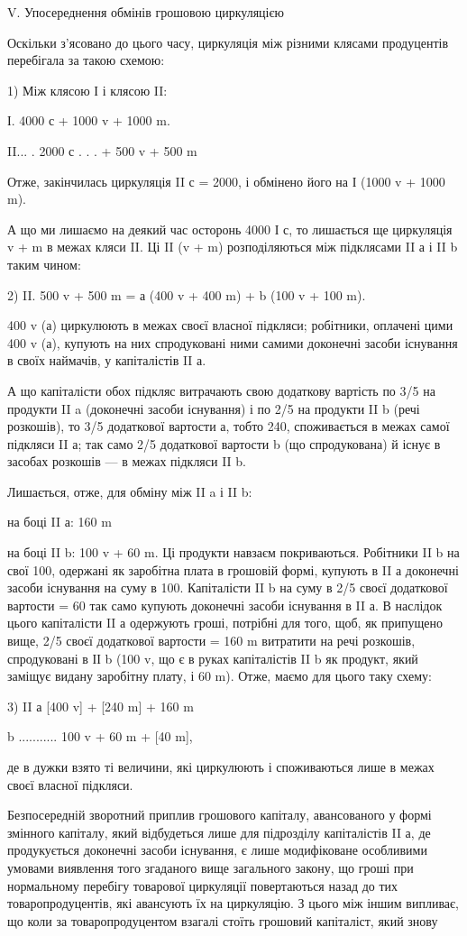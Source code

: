 V. Упосереднення обмінів грошовою циркуляцією

Оскільки з’ясовано до цього часу, циркуляція між різними клясами
продуцентів перебігала за такою схемою:

1) Між клясою І і клясою II:

І. 4000 с + 1000 v + 1000 m.

II... .    2000 с . . . + 500 v + 500 m

Отже, закінчилась циркуляція II с = 2000, і обмінено його на
І (1000 v + 1000 m).

А що ми лишаємо на деякий час осторонь 4000 І с, то лишається ще
циркуляція v + m в межах кляси II. Ці II (v + m) розподіляються між
підклясами II а і II b таким чином:

2) II. 500 v + 500 m = а (400 v + 400 m) + b (100 v + 100 m).

400 v (а) циркулюють в межах своєї власної підкляси; робітники,
оплачені цими 400 v (а), купують на них спродуковані ними самими доконечні
засоби існування в своїх наймачів, у капіталістів II а.

А що капіталісти обох підкляс витрачають свою додаткову вартість
по 3/5 на продукти II a (доконечні засоби існування) і по 2/5 на продукти
II b (речі розкошів), то 3/5 додаткової вартости а, тобто 240, споживається
в межах самої підкляси II а; так само 2/5 додаткової вартости b (що спродукована)
й існує в засобах розкошів — в межах підкляси II b.

Лишається, отже, для обміну між II a і II b:

на боці II а: 160 m

на боці II b: 100 v + 60 m. Ці продукти навзаєм покриваються. Робітники
II b на свої 100, одержані як заробітна плата в грошовій формі,
купують в II а доконечні засоби існування на суму в 100. Капіталісти
II b на суму в 2/5 своєї додаткової вартости = 60 так само купують
доконечні засоби існування в II а. В наслідок цього капіталісти II а одержують
гроші, потрібні для того, щоб, як припущено вище, 2/5 своєї
додаткової вартости = 160 m витратити на речі розкошів, спродуковані
в ІІ b (100 v, що є в руках капіталістів II b як продукт, який заміщує
видану заробітну плату, і 60 m). Отже, маємо для цього таку схему:

3) II а [400 v] + [240 m] + 160 m

b ........... 100 v + 60 m + [40 m],

де в дужки взято ті величини, які циркулюють і споживаються лише в
межах своєї власної підкляси.

Безпосередній зворотний приплив грошового капіталу, авансованого у
формі змінного капіталу, який відбудеться лише для підрозділу капіталістів
II а, де продукується доконечні засоби існування, є лише модифіковане
особливими умовами виявлення того згаданого вище
загального закону, що гроші при нормальному перебігу товарової
циркуляції повертаються назад до тих товаропродуцентів, які авансують
їх на циркуляцію. З цього між іншим випливає, що коли за
товаропродуцентом взагалі стоїть грошовий капіталіст, який знову
\parbreak{}  %
